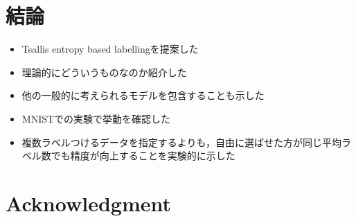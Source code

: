 \documentclass[a4paper,conference]{IEEEtran}
\begin{document}
\section{結論}
\begin{itemize}
    \item Tsallis entropy based labellingを提案した
    \item 理論的にどういうものなのか紹介した
    \item 他の一般的に考えられるモデルを包含することも示した
    \item MNISTでの実験で挙動を確認した
    \item 複数ラベルつけるデータを指定するよりも，自由に選ばせた方が同じ平均ラベル数でも精度が向上することを実験的に示した
\end{itemize}


\section*{Acknowledgment}




\end{document}
